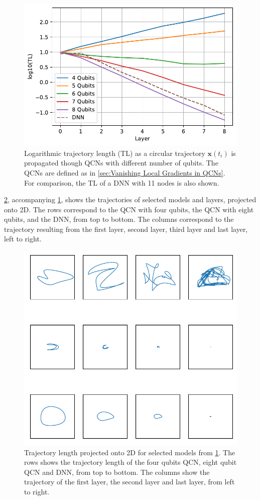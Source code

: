 \begin{figure}[H]
    \centering
    \includegraphics[width=12cm]{latex/figures/TL_untrained.pdf}
    \caption{Logarithmic trajectory length (TL) as a circular trajectory $\boldsymbol{x}(t_i)$ is propagated though QCNs with different number of qubits. The QCNs are defined as in \cref{sec:Vanishing Local Gradients in QCNs}. For comparison, the TL of a DNN with 11 nodes is also shown.}
    \label{fig:TL_untrained}
\end{figure}

\cref{fig:TL_untrained_projection}, accompanying \cref{fig:TL_untrained}, shows the trajectories of selected models and layers, projected onto 2D. The rows correspond to the QCN with four qubits, the QCN with eight qubits, and the DNN, from top to bottom. The columns correspond to the trajectory resulting from the first layer, second layer, third layer and last layer, left to right.   

\begin{figure}[H]
    \centering
    \includegraphics[width=12cm]{latex/figures/TL_untrained_projection.pdf}
    \caption{Trajectory length projected onto 2D for selected models from \cref{fig:TL_untrained}. The rows shows the trajectory length of the four qubits QCN, eight qubit QCN and DNN, from top to bottom. The columns show the trajectory of the first layer, the second layer and last layer, from left to right.}
    \label{fig:TL_untrained_projection}
\end{figure}

